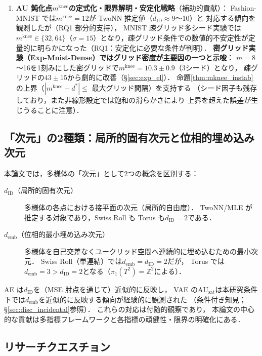\documentclass[11pt,a4paper]{jsarticle}
\newcommand{\dID}{d_{\mathrm{ID}}}
\newcommand{\AUsat}{\mathrm{AU}_{\mathrm{sat}}}
\newcommand{\mknee}{m^{\mathrm{knee}}}
\newcommand{\demb}{d_{\mathrm{emb}}}
\begin{document}
\begin{enumerate}
        stable identification 判定基準（§\ref{sec:natimg_stable_id}），
        および$\mknee$検出法比較（実験 Exp-NatImg-Knee）を実施した．
  \item \textbf{AU 鈍化点$\mknee$の定式化・限界解明・安定化戦略}（補助的貢献）：
        Fashion-MNIST では$\mknee = 12$が TwoNN 推定値（$\hat{d}_\mathrm{ID} \approx 9$〜10）と
        対応する傾向を観測したが（RQ1 部分的支持），
        MNIST 疎グリッド多シード実験では$\mknee \in \{32,64\}$（$\sigma=15$）となり，疎グリッド条件での数値的不安定性が定量的に明らかになった（RQ1：安定化に必要な条件が判明）．
        \textbf{密グリッド実験（Exp-Mnist-Dense）ではグリッド密度が主要因の一つと示唆}：
        $m=8$〜16を1刻みにした密グリッドで$\mknee = 10.3 \pm 0.9$（3シード）となり，
        疎グリッドの$43 \pm 15$から劇的に改善（§\ref{sec:exp_el}）．
        命題\ref{thm:mknee_instab}の上界（$|\mknee - d^*| \leq$ 最大グリッド間隔）を支持する
        （シード因子も残存しており，また非線形設定では飽和の滑らかさにより
        上界を超えた誤差が生じうることに注意）．
\end{enumerate}

\subsection{「次元」の2種類：局所的固有次元と位相的埋め込み次元}\label{sec:intro_dim}

本論文では，多様体の「次元」として2つの概念を区別する：

\begin{description}
  \item[$\dID$（局所的固有次元）]
        多様体の各点における接平面の次元（局所的自由度）．
        TwoNN/MLE が推定する対象であり，Swiss Roll も Torus も$\dID = 2$である．
  \item[$\demb$（位相的最小埋め込み次元）]
        多様体を自己交差なくユークリッド空間へ連続的に埋め込むための最小次元．
        Swiss Roll（単連結）では$\demb = \dID = 2$だが，
        Torus では$\demb = 3 > \dID = 2$となる（$\pi_1(T^2) = \mathbb{Z}^2$による）．
\end{description}

AE は$\dID$を（MSE 肘点を通じて）近似的に反映し，
VAE の$\AUsat$は本研究条件下では$\demb$を近似的に反映する傾向が経験的に観測された
（条件付き知見；§\ref{sec:disc_incidental}参照）．
これらの対応は付随的観察であり，
本論文の中心的な貢献は多指標フレームワークと各指標の頑健性・限界の明確化にある．

\subsection{リサーチクエスチョン}\label{sec:intro_rq}
\end{document}
